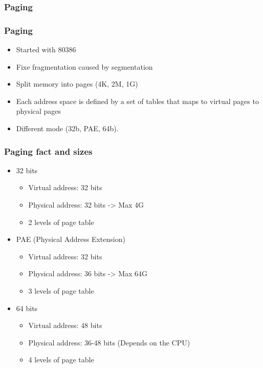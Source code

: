 \subsubsection{Paging}
        \begin{frame}
        \frametitle{Paging}
        \begin{itemize}
                \item Started with 80386
                \item Fixe fragmentation caused by segmentation
                \item Split memory into pages (4K, 2M, 1G)
                \item Each address space is defined by a set of
                tables that maps to virtual pages to physical pages
                \item Different mode (32b, PAE, 64b).
        \end{itemize}
        \end{frame}

        \begin{frame}
        \frametitle{Paging fact and sizes}
        \begin{itemize}
                \item 32 bits
                        \begin{itemize}
                        \item Virtual address: 32 bits
                        \item Physical address: 32 bits -> Max 4G
                        \item 2 levels of page table
                        \end{itemize}
                \item PAE (Physical Address Extension)
                        \begin{itemize}
                        \item Virtual address: 32 bits
                        \item Physical address: 36 bits -> Max 64G
                        \item 3 levels of page table
                        \end{itemize}
                \item 64 bits
                        \begin{itemize}
                        \item Virtual address: 48 bits
                        \item Physical address: 36-48 bits (Depends on
                        the CPU)
                        \item 4 levels of page table
                        \end{itemize}
        \end{itemize}
        \end{frame}
